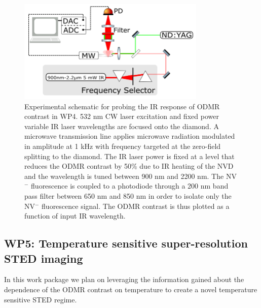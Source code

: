 \documentclass[11pt]{article}
\begin{document}
\begin{figure}
\centering
\includegraphics[width=0.8\textwidth]{Figures/WP4IRSchematic.png}
\caption{Experimental schematic for probing the IR response of ODMR contrast in WP4.  532 nm CW laser excitation and fixed power variable IR laser wavelengths are focused onto the diamond.  A microwave transmission line applies microwave radiation modulated in amplitude at 1 kHz with frequency targeted at the zero-field splitting to the diamond.  The IR laser power is fixed at a level that reduces the ODMR contrast by 50\% due to IR heating of the NVD and the wavelength is tuned between 900 nm and 2200 nm.  The NV$^-$ fluorescence is coupled to a photodiode through a 200 nm band pass filter between 650 nm and 850 nm in order to isolate only the NV$^-$ fluorescence signal.  The ODMR contrast is thus plotted as a function of input IR wavelength.}
\label{WP4IRrSchematic}
\end{figure}

\subsection{WP5: Temperature sensitive super-resolution STED imaging}
In this work package we plan on leveraging the information gained about the dependence of the ODMR contrast on 
temperature to create a novel temperature sensitive STED regime.
\end{document}
